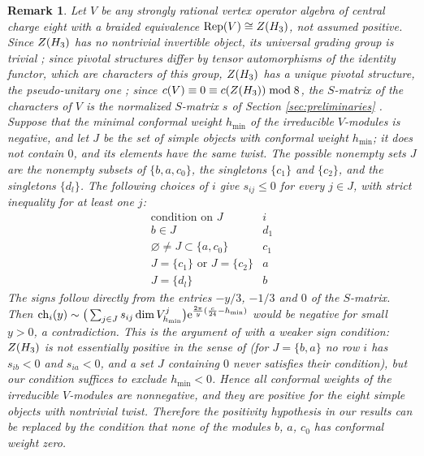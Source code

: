 \documentclass[leqno]{article}
\let\cal\relax
\newcommand{\cal}{\mathcal}
\renewcommand{\leq}{\ensuremath{\leqslant}}
\let\i\relax
\newcommand{\i}{\mathrm{i}}
\newcommand{\e}{\mathrm{e}}
\DeclareMathOperator{\Rep}{Rep}
\newtheorem{remark}[thm]{Remark}
\numberwithin{equation}{section}
\begin{document}
\begin{remark}\normalfont
\label{rem:essential-positivity}
Let $V$ be any strongly rational vertex operator algebra of central charge eight with a braided equivalence $\Rep(V) \cong Z(\cal H_3)$, not assumed positive. Since $Z(\cal H_3)$ has no nontrivial invertible object, its universal grading group is trivial \cite[Theorem 6.3]{GeN08}; since pivotal structures differ by tensor automorphisms of the identity functor, which are characters of this group, $Z(\cal H_3)$ has a unique pivotal structure, the pseudo-unitary one \cite{ENO05}; since $c(V) \equiv 0 \equiv c(Z(\cal H_3)) \bmod 8$, the $S$-matrix of the characters of $V$ is the normalized $S$-matrix $s$ of Section \ref{sec:preliminaries} \cite[Lemma 3.6]{MoR24a}. Suppose that the minimal conformal weight $h_{\min}$ of the irreducible $V$-modules is negative, and let $J$ be the set of simple objects with conformal weight $h_{\min}$; it does not contain $0$, and its elements have the same twist. The possible nonempty sets $J$ are the nonempty subsets of $\{b,a,c_0\}$, the singletons $\{c_1\}$ and $\{c_2\}$, and the singletons $\{d_l\}$. The following choices of $i$ give $s_{ij} \leq 0$ for every $j \in J$, with strict inequality for at least one $j$:
\[
\begin{array}{c|c}
\text{condition on } J & i \\ \hline
b \in J & d_1 \\
\varnothing \neq J \subset \{a,c_0\} & c_1 \\
J = \{c_1\} \text{ or } J = \{c_2\} & a \\
J = \{d_l\} & b
\end{array}
\]
The signs follow directly from the entries $-y/3$, $-1/3$ and $0$ of the $S$-matrix. Then $\operatorname{ch}_i(\i y) \sim \big(\sum_{j \in J}s_{ij}\dim V^j_{h_{\min}}\big)\e^{\frac{2\pi}{y}(\frac{c}{24}-h_{\min})}$ would be negative for small $y > 0$, a contradiction. This is the argument of \cite[Proposition 3.10]{MoR24a} with a weaker sign condition: $Z(\cal H_3)$ is not essentially positive in the sense of \cite{MoR24a} (for $J = \{b,a\}$ no row $i$ has $s_{ib} < 0$ and $s_{ia} < 0$, and a set $J$ containing $0$ never satisfies their condition), but our condition suffices to exclude $h_{\min} < 0$. Hence all conformal weights of the irreducible $V$-modules are nonnegative, and they are positive for the eight simple objects with nontrivial twist. Therefore the positivity hypothesis in our results can be replaced by the condition that none of the modules $b$, $a$, $c_0$ has conformal weight zero.
\end{remark}
\end{document}
